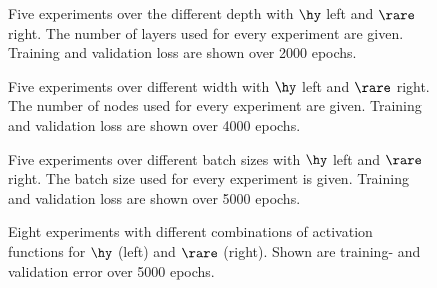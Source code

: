 \begin{center}
	\begin{figure}[htbp!]
		
		
		\caption{Five experiments over the different depth with $\hy$ left and $\rare$ right. The number of layers used for every experiment are given. Training and validation loss are shown over 2000 epochs.}
		\label{Fig:Depth}
	\end{figure}
\end{center}
\begin{center}
	\begin{figure}[htbp!]
		
		
		\caption{Five experiments over different width with $\hy$ left and $\rare$ right. The number of nodes used for every experiment are given. Training and validation loss are shown over 4000 epochs.}
		\label{Fig:Width}
	\end{figure}
\end{center}
\begin{center}
	\begin{figure}[htbp!]
		
		
		\caption{Five experiments over different batch sizes with $\hy$ left and $\rare$ right. The batch size used for every experiment is given. Training and validation loss are shown over 5000 epochs.}
		\label{Fig:batch}
	\end{figure}
\end{center}
\begin{center}
	\begin{figure}[H]
		
		
	\end{figure}
\end{center}
\begin{figure}[H]
	
	
		\caption{Eight experiments with different combinations of activation functions for \(\hy\) (left) and \(\rare\) (right). Shown are training- and validation error over 5000 epochs.}
\end{figure}\label{Fig:Activations}

